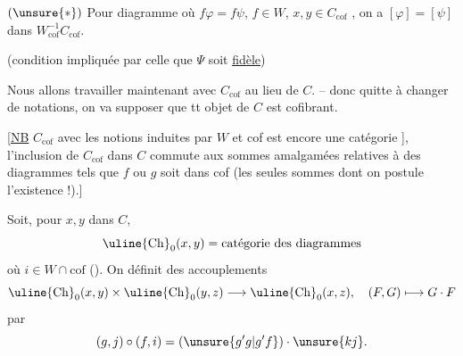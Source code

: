 $(\unsure{*})$ Pour  diagramme
où $f\varphi=f\psi$, $f\in W$, $x,y\in C_{\mathrm{cof}}$ , on a $[\varphi]=[\psi]$ dans $W_{\mathrm{cof}}^{-1}C_{\mathrm{cof}}$.

(condition impliquée par celle que $\Psi$ soit \uline{fidèle})

Nous allons travailler maintenant avec $C_{\mathrm{cof}}$ au lieu de $C$. -- donc quitte à changer de notations, on va supposer que tt objet de $C$ est cofibrant.

[\uline{NB} $C_{\mathrm{cof}}$ avec les notions induites par $W$ et cof est encore une catégorie ], l'inclusion de $C_{\mathrm{cof}}$ dans $C$ commute aux sommes amalgamées  relatives à des diagrammes
tels que $f$ ou $g$ soit dans cof (les seules sommes dont on postule l'existence !).]

Soit, pour $x,y$ dans $C$,
\[
\uline{\mathrm{Ch}}_0(x,y)=\text{catégorie des diagrammes}
\]
où $i\in W\cap\mathrm{cof}$  (). On définit des accouplements
\[
\uline{\mathrm{Ch}}_0(x,y)\times\uline{\mathrm{Ch}}_0(y,z)\longrightarrow\uline{\mathrm{Ch}}_0(x,z),\quad (F,G)\longmapsto G\mathbin{\cdot}F
\]
par
\[
(g,j)\mathbin{\circ}(f,i)=(\unsure{g'g|g'f})\mathbin{\cdot}\unsure{kj}.
\]

